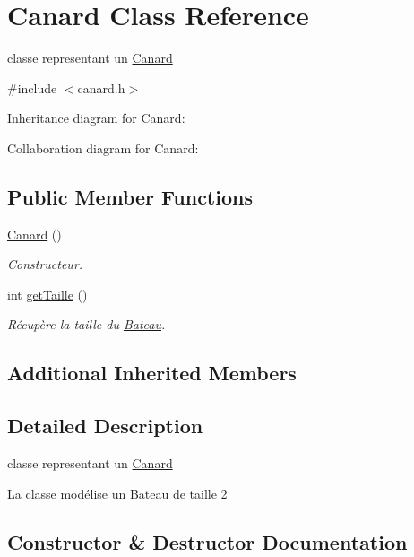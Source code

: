 \hypertarget{class_canard}{}\section{Canard Class Reference}
\label{class_canard}


classe representant un \hyperlink{class_canard}{Canard}  




{\ttfamily \#include $<$canard.\+h$>$}



Inheritance diagram for Canard\+:


Collaboration diagram for Canard\+:
\subsection*{Public Member Functions}
\begin{DoxyCompactItemize}
\item 
\hyperlink{class_canard_aca6cf94e49e14f5383fc7c798a8dfcf8}{Canard} ()
\begin{DoxyCompactList}\small\item\em Constructeur. \end{DoxyCompactList}\item 
int \hyperlink{class_canard_a5c99dcdcd79601f9cc075072c6fa8e47}{get\+Taille} ()
\begin{DoxyCompactList}\small\item\em Récupère la taille du \hyperlink{class_bateau}{Bateau}. \end{DoxyCompactList}\end{DoxyCompactItemize}
\subsection*{Additional Inherited Members}


\subsection{Detailed Description}
classe representant un \hyperlink{class_canard}{Canard} 

La classe modélise un \hyperlink{class_bateau}{Bateau} de taille 2 

\subsection{Constructor \& Destructor Documentation}
